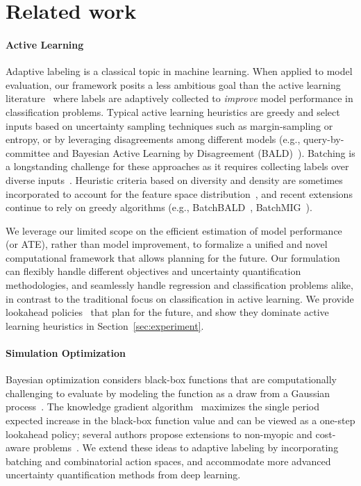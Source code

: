 
\section{Related work}
\label{sec:related-work}

\paragraph{Active Learning} Adaptive labeling is a classical topic in machine learning.
When applied to model evaluation, our framework posits a less  ambitious goal than the active learning literature~\citep{AggarwalKoGuHaPh14,Settles09} where labels are adaptively collected  to \emph{improve} model performance in classification problems. Typical active learning heuristics are greedy and select inputs based on uncertainty sampling techniques such as margin-sampling or entropy, or by leveraging disagreements among different models (e.g., query-by-committee and Bayesian Active Learning by Disagreement (BALD)~\citep{HoulsbyHuGhLe11}). 
Batching is a longstanding challenge for these approaches as it requires collecting labels over diverse inputs~\citep{Settles09}. Heuristic criteria based on diversity and density are sometimes incorporated to account for the feature space distribution~\citep{Settles09},  and recent extensions continue to rely on greedy algorithms (e.g., BatchBALD~\citep{KirschVaGa19}, BatchMIG~\citep{WangSuGr21}).

We leverage our limited scope on the efficient estimation of model performance (or ATE), rather than model improvement, 
to formalize a unified and novel computational framework that allows planning for the future.
Our formulation can flexibly handle different objectives and uncertainty quantification methodologies, and seamlessly handle regression and classification problems alike, in contrast to the traditional focus on classification in active learning.
We provide lookahead policies~\citep{BertsekasTs96,EfroniDaScMa18, EfroniGhMa20} that plan for the future, and show they dominate active learning heuristics in Section~\ref{sec:experiment}.

\paragraph{Simulation Optimization}
Bayesian optimization considers black-box functions that are computationally challenging to 
evaluate by modeling the function as a draw from a Gaussian process~\citep{Frazier18}. 
The knowledge gradient algorithm~\citep{FrazierPoDa08}
maximizes the single period expected increase in the black-box function value and can be viewed as a one-step lookahead policy; several authors propose extensions to non-myopic and cost-aware problems~\citep{AstudilloJiBaBaFr21}.
We extend these ideas to adaptive labeling  by incorporating batching and combinatorial action spaces, and accommodate more advanced uncertainty quantification methods from deep learning.

